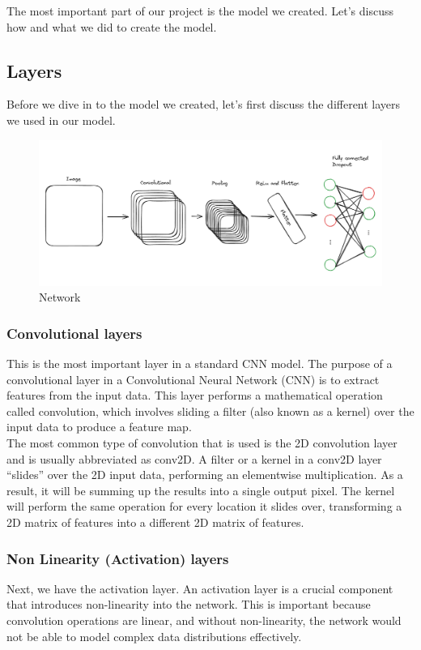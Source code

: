 \documentclass[../paper.tex]{subfiles}
\begin{document}
    The most important part of our project is the model we created.
    Let's discuss how and what we did to create the model.
    \subsection{Layers}
    Before we dive in to the model we created, let's first discuss the different layers we used in our model.
    \begin{figure}[h]
        \centering
        \includegraphics[width=\linewidth]{network}
        \caption{Network}
        \label{fig:network}
    \end{figure}
    \subsubsection{Convolutional layers}
    This is the most important layer in a standard CNN model.
    The purpose of a convolutional layer in a Convolutional Neural Network (CNN) is to extract features from the input data. 
    This layer performs a mathematical operation called convolution, 
    which involves sliding a filter (also known as a kernel) over the input data to produce a feature map.\cite{o4}\\
    The most common type of convolution that is used is the 2D convolution layer and is usually abbreviated as conv2D. 
    A filter or a kernel in a conv2D layer “slides” over the 2D input data, performing an elementwise multiplication. 
    As a result, it will be summing up the results into a single output pixel. 
    The kernel will perform the same operation for every location it slides over, transforming a 2D matrix of features into a different 2D matrix of features.\cite{o5}
    \subsubsection{Non Linearity (Activation) layers}
    Next, we have the activation layer.
    An activation layer is a crucial component that introduces non-linearity into the network. 
    This is important because convolution operations are linear, and without non-linearity, the network would not be able to model complex data distributions effectively.
\end{document}
